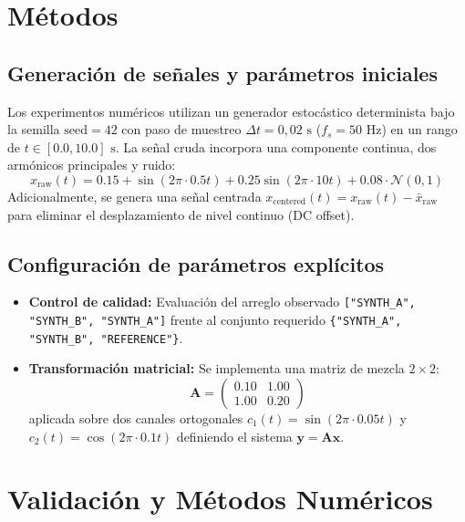 \documentclass[11pt,a4paper]{article}
\begin{document}
\section{Métodos}
\subsection{Generación de señales y parámetros iniciales}
Los experimentos numéricos utilizan un generador estocástico determinista bajo la semilla $\text{seed} = 42$ con paso de muestreo $\Delta t = 0,02\text{ s}$ ($f_s = 50\text{ Hz}$) en un rango de $t \in [0.0, 10.0]\text{ s}$. La señal cruda incorpora una componente continua, dos armónicos principales y ruido:
\begin{equation}
    x_{\text{raw}}(t) = 0.15 + \sin(2\pi \cdot 0.5 t) + 0.25 \sin(2\pi \cdot 10 t) + 0.08 \cdot \mathcal{N}(0,1)
    \label{eq:senal_sintetica}
\end{equation}
Adicionalmente, se genera una señal centrada $x_{\text{centered}}(t) = x_{\text{raw}}(t) - \bar{x}_{\text{raw}}$ para eliminar el desplazamiento de nivel continuo (DC offset).

\subsection{Configuración de parámetros explícitos}
\begin{itemize}
    \item \textbf{Control de calidad:} Evaluación del arreglo observado \texttt{["SYNTH\_A", "SYNTH\_B", "SYNTH\_A"]} frente al conjunto requerido \verb|{"SYNTH_A", "SYNTH_B", "REFERENCE"}|.
    \item \textbf{Transformación matricial:} Se implementa una matriz de mezcla $2 \times 2$:
    \begin{equation}
        \mathbf{A} = \begin{pmatrix} 0.10 & 1.00 \\ 1.00 & 0.20 \end{pmatrix}
        \label{eq:matriz_A}
    \end{equation}
    aplicada sobre dos canales ortogonales $c_1(t) = \sin(2\pi \cdot 0.05 t)$ y $c_2(t) = \cos(2\pi \cdot 0.1 t)$ definiendo el sistema $\mathbf{y} = \mathbf{A} \mathbf{x}$.
\end{itemize}

\section{Validación y Métodos Numéricos}
\end{document}
